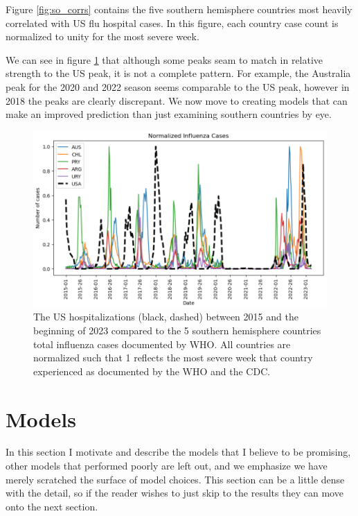 \documentclass[12pt,a4paper,english]{article}
\begin{document}
	

Figure \ref{fig:so_corrs} contains the five southern hemisphere countries most heavily correlated with US flu hospital cases. In this figure, each country case count is normalized to unity for the most severe week.

We can see in figure \ref{fig:so_cases} that although some peaks seam to match in relative strength to the US peak, it is not a complete pattern. For example, the Australia peak for the 2020 and 2022 season seems comparable to the US peak, however in 2018 the peaks are clearly discrepant. We now move to creating models that can make an improved prediction than just examining southern countries by eye.

	\begin{figure}[h!]
		\begin{center}
		\includegraphics[scale=0.75]{Pictures/flu_cases.png}
		\caption{The US hospitalizations (black, dashed) between 2015 and the beginning of 2023 compared to the 5 southern hemisphere countries total influenza cases documented by WHO. All countries are normalized such that 1 reflects the most severe week that country experienced as documented by the WHO and the CDC.}
		\end{center}
		\label{fig:so_cases}
	\end{figure}
\FloatBarrier
\section{Models}
In this section I motivate and describe the models that I believe to be promising, other models that performed poorly are left out, and we emphasize we have merely scratched the surface of model choices. This section can be a little dense with the detail, so if the reader wishes to just skip to the results they can move onto the next section.
\end{document}
